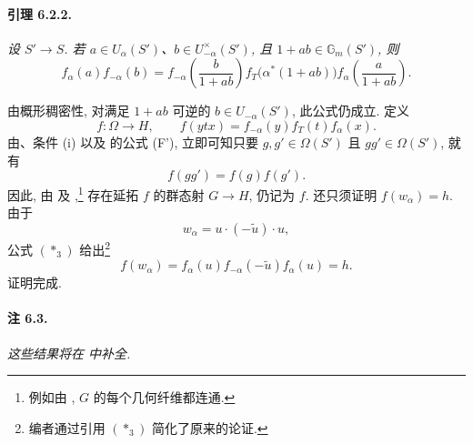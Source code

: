 \paragraph{\textbf{引理 6.2.2.}}
\emph{设 \(S'\to S\). 若 \(a\in U_\alpha(S')\)、\(b\in U_{-\alpha}^\times(S')\), 且 \(1+ab\in\mathbb G_m(S')\), 则}
\[
 f_\alpha(a)f_{-\alpha}(b)
 =
 f_{-\alpha}\!\left(\frac{b}{1+ab}\right)
 f_T\bigl(\alpha^\ast(1+ab)\bigr)
 f_\alpha\!\left(\frac{a}{1+ab}\right).
\]

由概形稠密性, 对满足 \(1+ab\) 可逆的 \(b\in U_{-\alpha}(S')\), 此公式仍成立. 定义
\[
 f\colon\Omega\longrightarrow H,
 \qquad
 f(ytx)=f_{-\alpha}(y)f_T(t)f_\alpha(x).
\]
由、条件 \textup{(i)} 以及  的公式 \textup{(F')}, 立即可知只要 \(g,g'\in\Omega(S')\) 且 \(gg'\in\Omega(S')\), 就有
\[
 f(gg')=f(g)f(g').
\]
因此, 由\textup{} 及 ,\footnote{例如由 , \(G\) 的每个几何纤维都连通.} 存在延拓 \(f\) 的群态射 \(G\to H\), 仍记为 \(f\). 还只须证明 \(f(w_\alpha)=h\). 由于
\[
 w_\alpha=u\cdot(-\widetilde u)\cdot u,
\]
公式 \((\ast_3)\) 给出\footnote{编者通过引用 \((\ast_3)\) 简化了原来的论证.}
\[
 f(w_\alpha)
 =f_\alpha(u)f_{-\alpha}(-\widetilde u)f_\alpha(u)
 =h.
\]
 证明完成.

\paragraph{\textbf{注 6.3.}}
\emph{这些结果将在 中补全.}
